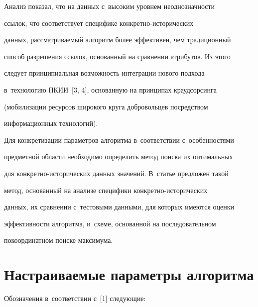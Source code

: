   


  Анализ показал, что на данных с~высоким уровнем неоднозначности 


ссылок, что соответствует специфике кон\-крет\-но-ис\-то\-ри\-че\-ских 


данных, рассматриваемый алгоритм более эффективен, чем традиционный 


способ разрешения ссылок, основанный на сравнении атрибутов. Из этого 


следует принципиальная воз\-мож\-ность интеграции нового подхода 


в~технологию ПКИИ~[3, 4], основанную на принципах краудсорсинга 


(мобилизации ресурсов широкого круга доб\-ро\-воль\-цев посредством 


информационных технологий). 


  


  Для конкретизации параметров алгоритма в~соответствии с~особенностями 


предметной об\-ласти необходимо определить метод поиска их оптимальных 


для кон\-крет\-но-ис\-то\-ри\-че\-ских данных значений. В~статье предложен такой 


метод, основанный на анализе специфики кон\-крет\-но-ис\-то\-ри\-че\-ских 


данных, их сравнении с~тес\-то\-вы\-ми данными, для которых имеются оценки 


эффективности алгоритма, и~схеме, основанной на последовательном 


покоординатном поиске максимума. 


  


\section{Настраиваемые параметры алгоритма}





  Обозначения в~соответствии с~[1] сле\-ду\-ющие:


